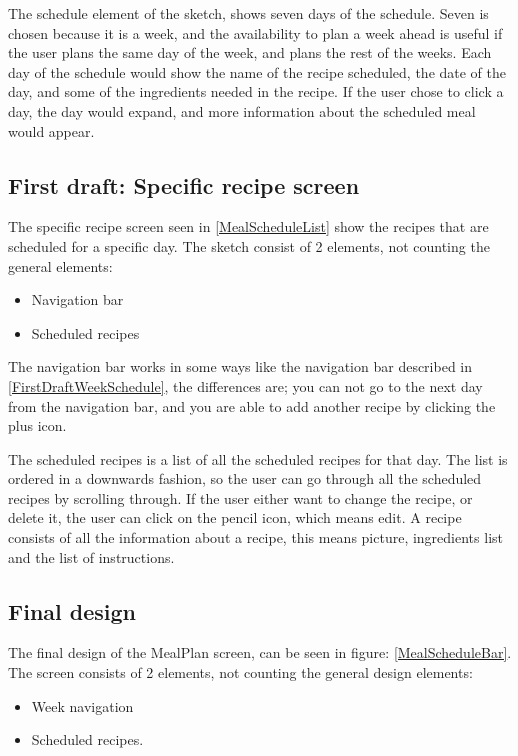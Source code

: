 The schedule element of the sketch, shows seven days of the schedule. Seven is chosen because it is a week, and the availability to plan a week ahead is useful if the user plans the same day of the week, and plans the rest of the weeks. Each day of the schedule would show the name of the recipe scheduled, the date of the day, and some of the ingredients needed in the recipe. If the user chose to click a day, the day would expand, and more information about the scheduled meal would appear.

\subsection{First draft: Specific recipe screen} \label{FirstDraftSpecificRecipeScreen}

The specific recipe screen seen in \cref{MealScheduleList} show the recipes that are scheduled for a specific day. The sketch consist of 2 elements, not counting the general elements:

\begin{itemize}
    \item Navigation bar
    \item Scheduled recipes
\end{itemize}

The navigation bar works in some ways like the navigation bar described in \cref{FirstDraftWeekSchedule}, the differences are; you can not go to the next day from the navigation bar, and you are able to add another recipe by clicking the plus icon. 

The scheduled recipes is a list of all the scheduled recipes for that day. The list is ordered in a downwards fashion, so the user can go through all the scheduled recipes by scrolling through. If the user either want to change the recipe, or delete it, the user can click on the pencil icon, which means edit. A recipe consists of all the information about a recipe, this means picture, ingredients list and the list of instructions.

\subsection{Final design}

The final design of the MealPlan screen, can be seen in figure: \cref{MealScheduleBar}. The screen consists of 2 elements, not counting the general design elements:

\begin{itemize}
    \item Week navigation
    \item Scheduled recipes.
\end{itemize}

